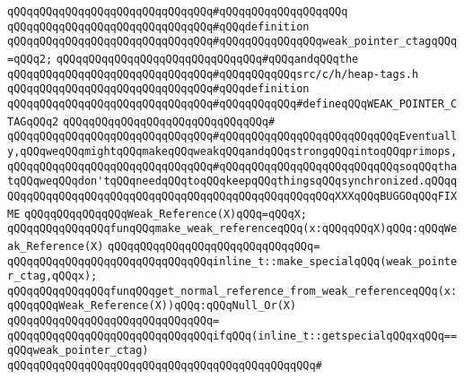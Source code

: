\verb|qQQqqQQqqQQqqQQqqQQqqQQqqQQqqQQq#qQQqqQQqqQQqqQQqqQQq|\newline
\verb|qQQqqQQqqQQqqQQqqQQqqQQqqQQqqQQq#qQQqdefinition|\newline
\verb|qQQqqQQqqQQqqQQqqQQqqQQqqQQqqQQq#qQQqqQQqqQQqqQQqweak_pointer_ctagqQQq=qQQq2;|\newline
\verb|qQQqqQQqqQQqqQQqqQQqqQQqqQQqqQQq#qQQqandqQQqthe|\newline
\verb|qQQqqQQqqQQqqQQqqQQqqQQqqQQqqQQq#qQQqqQQqqQQqsrc/c/h/heap-tags.h|\newline
\verb|qQQqqQQqqQQqqQQqqQQqqQQqqQQqqQQq#qQQqdefinition|\newline
\verb|qQQqqQQqqQQqqQQqqQQqqQQqqQQqqQQq#qQQqqQQqqQQq#defineqQQqWEAK_POINTER_CTAGqQQq2|\newline
\verb|qQQqqQQqqQQqqQQqqQQqqQQqqQQqqQQq#|\newline
\verb|qQQqqQQqqQQqqQQqqQQqqQQqqQQqqQQq#qQQqqQQqqQQqqQQqqQQqqQQqqQQqEventually,qQQqweqQQqmightqQQqmakeqQQqweakqQQqandqQQqstrongqQQqintoqQQqprimops,|\newline
\verb|qQQqqQQqqQQqqQQqqQQqqQQqqQQqqQQq#qQQqqQQqqQQqqQQqqQQqqQQqqQQqsoqQQqthatqQQqweqQQqdon'tqQQqneedqQQqtoqQQqkeepqQQqthingsqQQqsynchronized.qQQqqQQqqQQqqQQqqQQqqQQqqQQqqQQqqQQqqQQqqQQqqQQqqQQqqQQqXXXqQQqBUGGOqQQqFIXME|\newline
\newline
\verb|qQQqqQQqqQQqqQQqWeak_Reference(X)qQQq=qQQqX;|\newline
\newline
\verb|qQQqqQQqqQQqqQQqfunqQQqmake_weak_referenceqQQq(x:qQQqqQQqX)qQQq:qQQqWeak_Reference(X)|\newline
\verb|qQQqqQQqqQQqqQQqqQQqqQQqqQQqqQQq=|\newline
\verb|qQQqqQQqqQQqqQQqqQQqqQQqqQQqqQQqinline_t::make_specialqQQq(weak_pointer_ctag,qQQqx);|\newline
\newline
\verb|qQQqqQQqqQQqqQQqfunqQQqget_normal_reference_from_weak_referenceqQQq(x:qQQqqQQqWeak_Reference(X))qQQq:qQQqNull_Or(X)|\newline
\verb|qQQqqQQqqQQqqQQqqQQqqQQqqQQqqQQq=|\newline
\verb|qQQqqQQqqQQqqQQqqQQqqQQqqQQqqQQqifqQQq(inline_t::getspecialqQQqxqQQq==qQQqweak_pointer_ctag)|\newline
\verb|qQQqqQQqqQQqqQQqqQQqqQQqqQQqqQQqqQQqqQQqqQQqqQQq#|\newline
